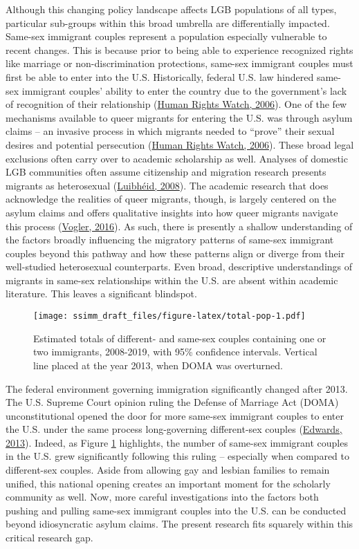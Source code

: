\documentclass[
  11pt,
]{article}
\begin{document}
Although this changing policy landscape affects LGB populations of all types, particular sub-groups within this broad umbrella are differentially impacted. Same-sex immigrant couples represent a population especially vulnerable to recent changes. This is because prior to being able to experience recognized rights like marriage or non-discrimination protections, same-sex immigrant couples must first be able to enter into the U.S. Historically, federal U.S. law hindered same-sex immigrant couples' ability to enter the country due to the government's lack of recognition of their relationship (\protect\hyperlink{ref-humanrightswatch_2006}{Human Rights Watch, 2006}). One of the few mechanisms available to queer migrants for entering the U.S. was through asylum claims -- an invasive process in which migrants needed to ``prove'' their sexual desires and potential persecution (\protect\hyperlink{ref-humanrightswatch_2006}{Human Rights Watch, 2006}). These broad legal exclusions often carry over to academic scholarship as well. Analyses of domestic LGB communities often assume citizenship and migration research presents migrants as heterosexual (\protect\hyperlink{ref-luibheid_2008}{Luibhéid, 2008}). The academic research that does acknowledge the realities of queer migrants, though, is largely centered on the asylum claims and offers qualitative insights into how queer migrants navigate this process (\protect\hyperlink{ref-vogler_2016}{Vogler, 2016}). As such, there is presently a shallow understanding of the factors broadly influencing the migratory patterns of same-sex immigrant couples beyond this pathway and how these patterns align or diverge from their well-studied heterosexual counterparts. Even broad, descriptive understandings of migrants in same-sex relationships within the U.S. are absent within academic literature. This leaves a significant blindspot.

\begin{figure}
\centering
\texttt{[image: ssimm\_draft\_files/figure-latex/total-pop-1.pdf]}
\caption{\label{fig:total-pop}Estimated totals of different- and same-sex couples containing one or two immigrants, 2008-2019, with 95\% confidence intervals. Vertical line placed at the year 2013, when DOMA was overturned.}
\end{figure}

The federal environment governing immigration significantly changed after 2013. The U.S. Supreme Court opinion ruling the Defense of Marriage Act (DOMA) unconstitutional opened the door for more same-sex immigrant couples to enter the U.S. under the same process long-governing different-sex couples (\protect\hyperlink{ref-edwards_2013}{Edwards, 2013}). Indeed, as Figure \ref{fig:total-pop} highlights, the number of same-sex immigrant couples in the U.S. grew significantly following this ruling -- especially when compared to different-sex couples. Aside from allowing gay and lesbian families to remain unified, this national opening creates an important moment for the scholarly community as well. Now, more careful investigations into the factors both pushing and pulling same-sex immigrant couples into the U.S. can be conducted beyond idiosyncratic asylum claims. The present research fits squarely within this critical research gap.
\end{document}
